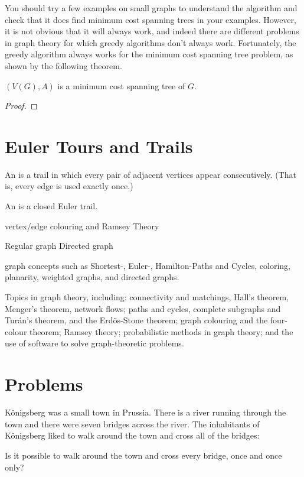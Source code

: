 You should try a few examples on small graphs to understand the algorithm and check that it does find minimum cost spanning trees in your examples. However, it is not obvious that it will always work, and indeed there are different problems in graph theory for which greedy algorithms don't always work. Fortunately, the greedy algorithm always works for the minimum cost spanning tree problem, as shown by the following theorem.

\begin{theorem}
$(V(G),A)$ is a minimum cost spanning tree of $G$.
\end{theorem}

\begin{proof}

\end{proof}

\section{Euler Tours and Trails}
An  is a trail in which every pair of adjacent vertices appear consecutively. (That is, every edge is used exactly once.)

An  is a closed Euler trail.


vertex/edge colouring and Ramsey Theory

Regular graph
Directed graph

graph concepts such as Shortest-, Euler-, Hamilton-Paths and Cycles, coloring, planarity, weighted graphs, and directed graphs.

Topics in graph theory, including: connectivity and matchings, Hall's theorem, Menger's theorem, network flows; paths and cycles, complete subgraphs and Turán's theorem, and the Erdös-Stone theorem; graph colouring and the four-colour theorem; Ramsey theory; probabilistic methods in graph theory; and the use of software to solve graph-theoretic problems.
\pagebreak

\section*{Problems}
\begin{prbm}
K\"{o}nigsberg was a small town in Prussia. There is a river running through the town and there were seven bridges across the river. The inhabitants of K\"{o}nigsberg liked to walk around the town and cross all of the bridges:

Is it possible to walk around the town and cross every bridge, once and once only?
\end{prbm}

